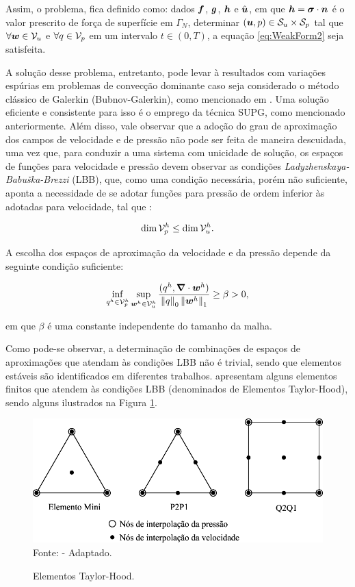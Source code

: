 Assim, o problema, fica definido como: dados $\boldsymbol{f}$, $\boldsymbol{g}$, $\boldsymbol{h}$ e $\hat{\boldsymbol{u}}$, em que $\boldsymbol{h}=\boldsymbol{\sigma}\cdot\boldsymbol{n}$ é o valor prescrito de força de superfície em $\Gamma_N$, determinar $(\boldsymbol{u},p)\in\mathcal{S}_u\times\mathcal{S}_p$ tal que $\forall\boldsymbol{w}\in\mathcal{V}_u$ e $\forall q\in\mathcal{V}_p$ em um intervalo $t\in(0,T)$, a equação \eqref{eq:WeakForm2} seja satisfeita.

A solução desse problema, entretanto, pode levar à resultados com variações espúrias em problemas de convecção dominante caso seja considerado o método clássico de Galerkin (Bubnov-Galerkin), como mencionado em \cite{fernandes2020tecnica,donea2003finite,brooks1982streamline}. Uma solução eficiente e consistente para isso é o emprego da técnica SUPG, como mencionado anteriormente. Além disso, vale observar que a adoção do grau de aproximação dos campos de velocidade e de pressão não pode ser feita de maneira descuidada, uma vez que, para conduzir a uma sistema com unicidade de solução, os espaços de funções para velocidade e pressão devem observar as condições \textit{Ladyzhenskaya-Babuška-Brezzi} (LBB), que, como uma condição necessária, porém não suficiente, aponta a necessidade de se adotar funções para pressão de ordem inferior às adotadas para velocidade, tal que \cite{donea2003finite}:

\begin{equation}
    \dim{\mathcal{V}_p^h}\leq\dim{\mathcal{V}_u^h}\text{.}
\end{equation}

A escolha dos espaços de aproximação da velocidade e da pressão depende da seguinte condição suficiente:

\begin{equation}
    \inf_{q^h\in\mathcal{V}_p^h}{\sup_{\boldsymbol{w}^h\in\mathcal{V}_u^h}{\frac{(q^h,\boldsymbol{\nabla}\cdot\boldsymbol{w}^h)}{\left\lVert{q}\right\lVert_0\left\lVert{\boldsymbol{w}^h}\right\lVert_1}}}\geq\beta>0\text{,}
\end{equation}

\noindent em que $\beta$ é uma constante independente do tamanho da malha.

Como pode-se observar, a determinação de combinações de espaços de aproximações que atendam às condições LBB não é trivial, sendo que elementos estáveis são identificados em diferentes trabalhos.  apresentam alguns elementos finitos que atendem às condições LBB (denominados de Elementos Taylor-Hood), sendo alguns ilustrados na Figura \ref{fig:Taylor-Hood}.

\begin{figure}[h!]
    \centering
    \caption{Elementos Taylor-Hood.}
    \includegraphics[width=.65\linewidth]{Figuras/Taylor-Hood.pdf}
    \\Fonte:  - Adaptado.
    \label{fig:Taylor-Hood}
\end{figure}

